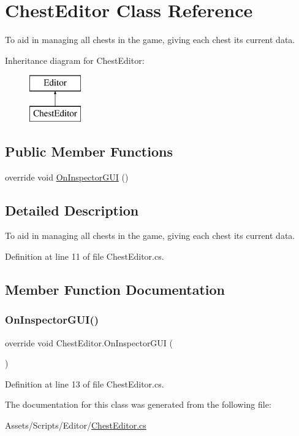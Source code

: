 \hypertarget{class_chest_editor}{}\section{Chest\+Editor Class Reference}
\label{class_chest_editor}


To aid in managing all chests in the game, giving each chest its current data.  


Inheritance diagram for Chest\+Editor\+:\begin{figure}[H]
\begin{center}
\leavevmode
\includegraphics[height=2.000000cm]{class_chest_editor}
\end{center}
\end{figure}
\subsection*{Public Member Functions}
\begin{DoxyCompactItemize}
\item 
override void \mbox{\hyperlink{class_chest_editor_a06596d3b88fc8e72ccdbd39b722218d2}{On\+Inspector\+G\+UI}} ()
\end{DoxyCompactItemize}


\subsection{Detailed Description}
To aid in managing all chests in the game, giving each chest its current data. 



Definition at line 11 of file Chest\+Editor.\+cs.



\subsection{Member Function Documentation}
\mbox{\label{class_chest_editor_a06596d3b88fc8e72ccdbd39b722218d2}} 
\subsubsection{\texorpdfstring{On\+Inspector\+G\+U\+I()}{OnInspectorGUI()}}
{\footnotesize\ttfamily override void Chest\+Editor.\+On\+Inspector\+G\+UI (\begin{DoxyParamCaption}{ }\end{DoxyParamCaption})}



Definition at line 13 of file Chest\+Editor.\+cs.



The documentation for this class was generated from the following file\+:\begin{DoxyCompactItemize}
\item 
Assets/\+Scripts/\+Editor/\mbox{\hyperlink{_chest_editor_8cs}{Chest\+Editor.\+cs}}\end{DoxyCompactItemize}
